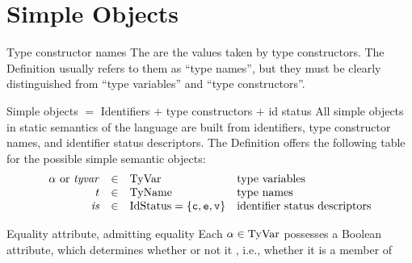 \section{Simple Objects}\label{sec:static-core:simple-objects}

\begin{definition}{Type constructor names}
The  are the values taken by type
constructors. The Definition usually refers to them as ``type names'',
but they must be clearly distinguished from ``type variables'' and
``type constructors''.
\end{definition}

\begin{clause}{Simple objects $=$ Identifiers $+$ type constructors $+$ id status}
All simple objects in static semantics of the language are built from
identifiers, type constructor names, and identifier status
descriptors. The Definition offers the following table for the possible
simple semantic objects:
\begin{equation*}
\begin{array}{rcll}
\alpha\ {\rm or}\ \textit{tyvar\/} & \in   & {\rm TyVar}       & \mbox{type variables}\\
t                & \in   & {\rm TyName}     & \mbox{type names}\\
\textit{is\/}              & \in   & \hbox{\rm IdStatus} = \{\hbox{\tt c},\hbox{\tt e},\hbox{\tt v}\}    & \mbox{identifier status descriptors}
\end{array}
\end{equation*}
\end{clause}

\begin{definition}{Equality attribute, admitting equality}
Each $\alpha\in{\rm TyVar}$ possesses a Boolean  attribute,
which determines whether or not it , i.e.,
whether it is a member of \EtyVar{} 
\end{definition}

